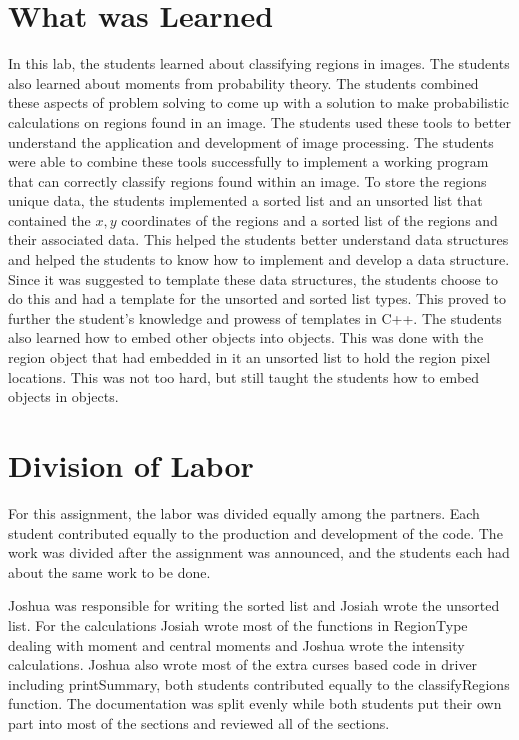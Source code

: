 \documentclass[pdftex, 12pt]{article}
\begin{document}
\begin{description}
\begin{description}
\begin{description}
				\section{What was Learned}

				In this lab, the students learned about classifying regions in images. The students also learned about moments from
				probability theory. The students combined these aspects of problem solving to come up with a solution to make
				probabilistic calculations on regions found in an image.  The students used these tools to better understand the
				application and development of image processing. The students were able to combine these tools successfully to implement
				a working program that can correctly classify regions found within an image. To store the regions unique data, the
				students implemented a sorted list and an unsorted list that contained the $x,y$ coordinates of the regions and a sorted
				list of the regions and their associated data. This helped the students better understand data structures and helped the
				students to know how to implement and develop a data structure. Since it was suggested to template these data
				structures, the students choose to do this and had a template for the unsorted and sorted list types. This proved to
				further the student's knowledge and prowess of templates in C++.  The students also learned how to embed other objects
				into objects. This was done with the region object that had embedded in it an unsorted list to hold the region pixel
				locations. This was not too hard, but still taught the students how to embed objects in objects.

				\section{Division of Labor}

				For this assignment, the labor was divided equally among the partners. Each student contributed equally to the
				production and development of the code. The work was divided after the assignment was announced, and the students each
				had about the same work to be done.

				Joshua was responsible for writing the sorted list and Josiah wrote the unsorted list.  For the calculations Josiah
				wrote most of the functions in RegionType dealing with moment and central moments and Joshua wrote the intensity
				calculations.  Joshua also wrote most of the extra curses based code in driver including printSummary, both students
				contributed equally to the classifyRegions function.  The documentation was split evenly while both students put their
				own part into most of the sections and reviewed all of the sections.


\end{description}
\end{description}
\end{description}
\end{document}
